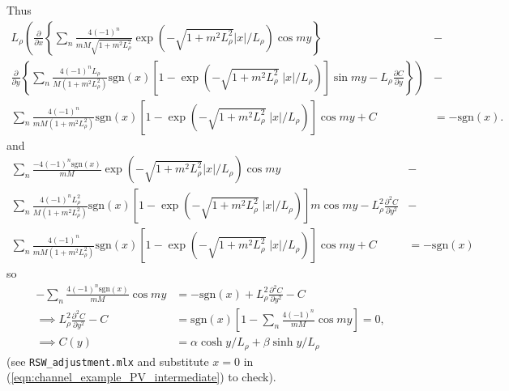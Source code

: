 \documentclass[10pt,reqno]{amsart}
\newcommand{\sign}{\mathrm{sgn}}
\begin{document}
Thus
\begin{align}
L_\rho \left( \frac{\partial }{\partial x} \left \{ 
\sum_n \frac{4 {\left(-1\right)}^{n} }{m M \sqrt{ 1+  m^2 L_\rho^2 }} \exp \left( -\sqrt{1 + m^2 L_\rho^2 }  |x| / L_\rho \right) \cos m y  \right\} \right. & - \nonumber  \\
\left. \frac{\partial }{\partial y} 
\left\{
\sum_n \frac{4 {\left(-1\right)}^{n} L_\rho}{ M \left( 1 + m^2 L_\rho^2 \right)} \sign(x) \left[ 1 - \exp \left( - \sqrt{ 1 + m^2 L_\rho^2 } \; |x| /L_\rho \right) \right] \sin m y  -  L_\rho \frac{\partial C}{\partial y}
\right\}
\right) & - \nonumber  \\
\sum_n \frac{4 {\left(-1\right)}^{n} }{m M \left( 1 + m^2 L_\rho^2 \right)} \sign(x) \left[ 1 - \exp \left( - \sqrt{ 1 + m^2 L_\rho^2 } \; |x| /L_\rho \right) \right] \cos m y + C &=  - \sign(x) . \nonumber
\end{align}
and 
\begin{align}
\sum_n \frac{- 4 {\left(-1\right)}^{n} \sign(x)}{m M} \exp \left( -\sqrt{1 + m^2 L_\rho^2 }  |x| / L_\rho \right) \cos m y  & -  \nonumber \\
\sum_n \frac{4 {\left(-1\right)}^{n} L_\rho^2}{ M \left( 1 + m^2 L_\rho^2 \right)} \sign(x) \left[ 1 - \exp \left( - \sqrt{ 1 + m^2 L_\rho^2 } \; |x| /L_\rho \right) \right] m \cos m y  -  L_\rho^2 \frac{\partial^2 C}{\partial y^2} & - \nonumber  \\
\sum_n \frac{4 {\left(-1\right)}^{n} }{m M \left( 1 + m^2 L_\rho^2 \right)} \sign(x) \left[ 1 - \exp \left( - \sqrt{ 1 + m^2 L_\rho^2 } \; |x| /L_\rho \right) \right] \cos m y + C
&=  - \sign(x)
\label{eqn:channel_example_PV_intermediate}
\end{align}
so
\begin{align}
-\sum_n \frac{4 {\left(-1\right)}^{n} \sign(x)}{m M}  \cos m y
&=  - \sign(x) +  L_\rho^2 \frac{\partial^2 C}{\partial y^2} - C \nonumber \\
\implies
L_\rho^2 \frac{\partial^2 C}{\partial y^2} - C  & = \sign(x) \left[ 1 - \sum_n \frac{4 {\left(-1\right)}^{n} }{m M} \cos m y \right] = 0, \nonumber \\
\implies C(y) &= \alpha \cosh y/L_\rho + \beta \sinh y/L_\rho 
\end{align}
(see \texttt{RSW\_adjustment.mlx} and substitute $x=0$ in (\ref{eqn:channel_example_PV_intermediate}) to check).
\end{document}
